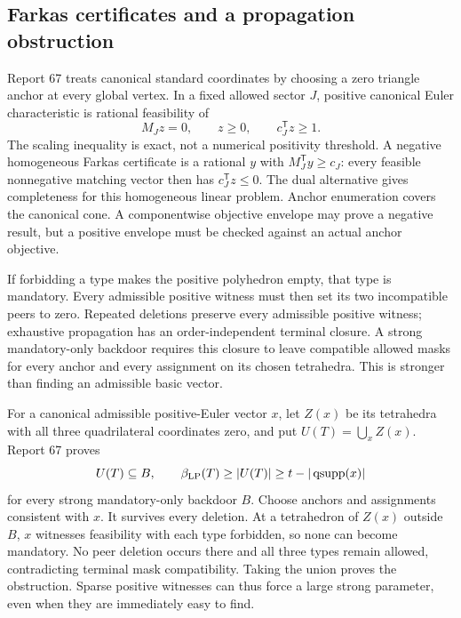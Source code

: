 \subsection{Farkas certificates and a propagation obstruction}

Report 67 treats canonical standard coordinates by choosing a zero triangle
anchor at every global vertex. In a fixed allowed sector $J$, positive
canonical Euler characteristic is rational feasibility of
\[
 M_Jz=0,\qquad z\ge0,\qquad c_J^{\mathsf T}z\ge1.
\]
The scaling inequality is exact, not a numerical positivity threshold.
A negative homogeneous Farkas certificate is a rational $y$ with
$M_J^{\mathsf T}y\ge c_J$: every feasible nonnegative matching vector then
has $c_J^{\mathsf T}z\le0$. The dual alternative gives completeness for
this homogeneous linear problem. Anchor enumeration covers the canonical
cone. A componentwise objective envelope may prove a negative result, but
a positive envelope must be checked against an actual anchor objective.

If forbidding a type makes the positive polyhedron empty, that type is
mandatory. Every admissible positive witness must then set its two
incompatible peers to zero. Repeated deletions preserve every admissible
positive witness; exhaustive propagation has an order-independent terminal
closure. A strong mandatory-only backdoor requires this closure to leave
compatible allowed masks for every anchor and every assignment on its
chosen tetrahedra. This is stronger than finding an admissible basic vector.

For a canonical admissible positive-Euler vector $x$, let $Z(x)$ be its
tetrahedra with all three quadrilateral coordinates zero, and put
$U(T)=\bigcup_x Z(x)$. Report 67 proves
\[
 U(T)\subseteq B,\qquad
 \beta_{\rm LP}(T)\ge |U(T)|\ge t-|\operatorname{qsupp}(x)|
\]
for every strong mandatory-only backdoor $B$. Choose anchors and assignments
consistent with $x$. It survives every deletion. At a tetrahedron of $Z(x)$
outside $B$, $x$ witnesses feasibility with each type forbidden, so none
can become mandatory. No peer deletion occurs there and all three types
remain allowed, contradicting terminal mask compatibility. Taking the union
proves the obstruction. Sparse positive witnesses can thus force a large
strong parameter, even when they are immediately easy to find.


